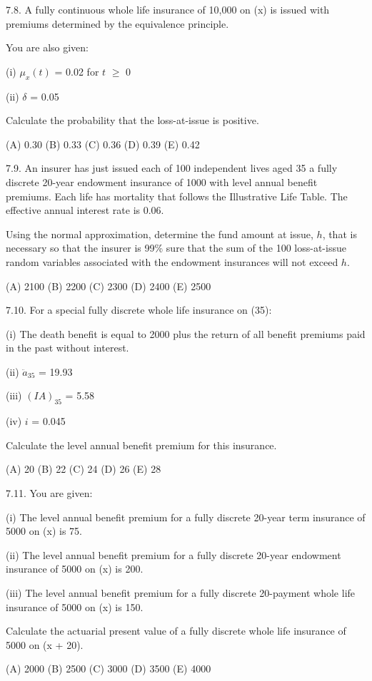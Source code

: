 \documentclass[]{book}
\begin{document}
7.8. A fully continuous whole life insurance of 10,000 on (x) is issued
with premiums determined by the equivalence principle.

You are also given:

(i) \(\mu_x(t)\) = 0.02 for \(t\) \(\ge\) 0

(ii) \(\delta\) = 0.05

Calculate the probability that the loss-at-issue is positive.

(A) 0.30 (B) 0.33 (C) 0.36 (D) 0.39 (E) 0.42

7.9. An insurer has just issued each of 100 independent lives aged 35 a
fully discrete 20-year endowment insurance of 1000 with level annual
benefit premiums. Each life has mortality that follows the Illustrative
Life Table. The effective annual interest rate is 0.06.

Using the normal approximation, determine the fund amount at issue,
\(h\), that is necessary so that the insurer is 99\% sure that the sum
of the 100 loss-at-issue random variables associated with the endowment
insurances will not exceed \(h\).

(A) 2100 (B) 2200 (C) 2300 (D) 2400 (E) 2500

7.10. For a special fully discrete whole life insurance on (35):

(i) The death benefit is equal to 2000 plus the return of all benefit
premiums paid in the past without interest.

(ii) \(\ddot{a}_{35}\) = 19.93

(iii) \((IA)_{35}\) = 5.58

(iv) \(i\) = 0.045

Calculate the level annual benefit premium for this insurance.

(A) 20 (B) 22 (C) 24 (D) 26 (E) 28

7.11. You are given:

(i) The level annual benefit premium for a fully discrete 20-year term
insurance of 5000 on (x) is 75.

(ii) The level annual benefit premium for a fully discrete 20-year
endowment insurance of 5000 on (x) is 200.

(iii) The level annual benefit premium for a fully discrete 20-payment
whole life insurance of 5000 on (x) is 150.

Calculate the actuarial present value of a fully discrete whole life
insurance of 5000 on (x + 20).

(A) 2000 (B) 2500 (C) 3000 (D) 3500 (E) 4000
\end{document}
